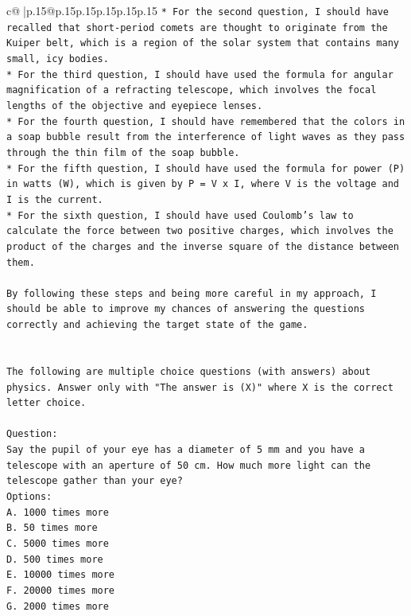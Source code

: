\documentclass{article}
\begin{document}
{\begin{supertabular}{c@{$\;$}|p{.15\linewidth}@{}p{.15\linewidth}p{.15\linewidth}p{.15\linewidth}p{.15\linewidth}p{.15\linewidth}}
{{{\texttt{* For the second question, I should have recalled that short{-}period comets are thought to originate from the Kuiper belt, which is a region of the solar system that contains many small, icy bodies.} \\
\texttt{* For the third question, I should have used the formula for angular magnification of a refracting telescope, which involves the focal lengths of the objective and eyepiece lenses.} \\
\texttt{* For the fourth question, I should have remembered that the colors in a soap bubble result from the interference of light waves as they pass through the thin film of the soap bubble.} \\
\texttt{* For the fifth question, I should have used the formula for power (P) in watts (W), which is given by P = V x I, where V is the voltage and I is the current.} \\
\texttt{* For the sixth question, I should have used Coulomb's law to calculate the force between two positive charges, which involves the product of the charges and the inverse square of the distance between them.} \\
\\ 
\texttt{By following these steps and being more careful in my approach, I should be able to improve my chances of answering the questions correctly and achieving the target state of the game.} \\
\\ 
\\ 
\texttt{The following are multiple choice questions (with answers) about physics. Answer only with "The answer is (X)" where X is the correct letter choice.} \\
\\ 
\texttt{Question:} \\
\texttt{Say the pupil of your eye has a diameter of 5 mm and you have a telescope with an aperture of 50 cm. How much more light can the telescope gather than your eye?} \\
\texttt{Options:} \\
\texttt{A. 1000 times more} \\
\texttt{B. 50 times more} \\
\texttt{C. 5000 times more} \\
\texttt{D. 500 times more} \\
\texttt{E. 10000 times more} \\
\texttt{F. 20000 times more} \\
\texttt{G. 2000 times more} \\
}}}
\end{supertabular}}
\end{document}
